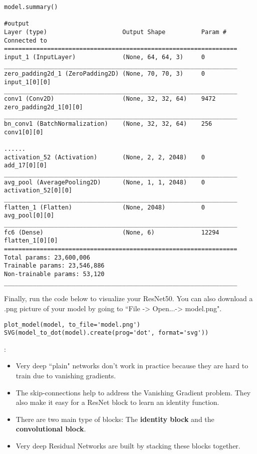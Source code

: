 \begin{verbatim}
model.summary()

#output
Layer (type)                     Output Shape          Param #     Connected to                     
=================================================================
input_1 (InputLayer)             (None, 64, 64, 3)     0                                            
_________________________________________________________________
zero_padding2d_1 (ZeroPadding2D) (None, 70, 70, 3)     0           input_1[0][0]                    
_________________________________________________________________
conv1 (Conv2D)                   (None, 32, 32, 64)    9472        zero_padding2d_1[0][0]           
_________________________________________________________________
bn_conv1 (BatchNormalization)    (None, 32, 32, 64)    256         conv1[0][0]                      

......
activation_52 (Activation)       (None, 2, 2, 2048)    0           add_17[0][0]                     
_________________________________________________________________
avg_pool (AveragePooling2D)      (None, 1, 1, 2048)    0           activation_52[0][0]              
_________________________________________________________________
flatten_1 (Flatten)              (None, 2048)          0           avg_pool[0][0]                   _________________________________________________________________
fc6 (Dense)                      (None, 6)             12294       flatten_1[0][0]                  
=================================================================
Total params: 23,600,006
Trainable params: 23,546,886
Non-trainable params: 53,120
_________________________________________________________________
\end{verbatim}


Finally, run the code below to visualize your ResNet50. You can also download a .png picture of your model by going to ``File -> Open...-> model.png".
\begin{verbatim}
plot_model(model, to_file='model.png')
SVG(model_to_dot(model).create(prog='dot', format='svg'))
\end{verbatim}

\begin{tcolorbox}
{:
\begin{itemize}
\item Very deep ``plain" networks don't work in practice because they are hard to train due to vanishing gradients.
\item The skip-connections help to address the Vanishing Gradient problem. They also make it easy for a ResNet block to learn an identity function.
\item There are two main type of blocks: The {\textbf {identity block}} and the {\textbf {convolutional block}}.
\item Very deep Residual Networks are built by stacking these blocks together.
\end{itemize}
}
\end{tcolorbox}


